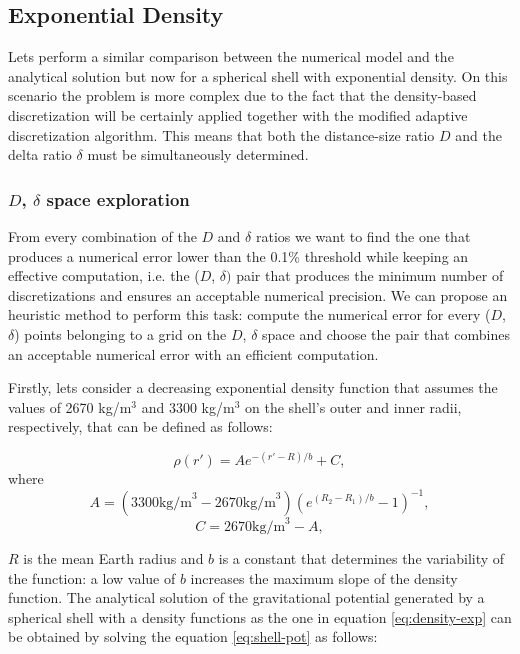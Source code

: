 \documentclass[extra]{gji}
\begin{document}
\subsection{Exponential Density}

Lets perform a similar comparison between the numerical model and
the analytical solution but now for a spherical shell with exponential
density.
On this scenario the problem is more complex due to the fact that the
density-based discretization will be certainly applied together with
the modified adaptive discretization algorithm.
This means that both the distance-size ratio $D$ and the delta ratio
$\delta$ must be simultaneously determined.

\subsubsection{$D$, $\delta$ space exploration}

From every combination of the $D$ and $\delta$ ratios we want to find
the one that produces a numerical error lower than the 0.1\% threshold
while keeping an effective computation, i.e. the ($D$, $\delta)$ pair
that produces the minimum number of discretizations and ensures an
acceptable numerical precision.
We can propose an heuristic method to perform this task: compute the
numerical error for every ($D$, $\delta$) points belonging to a grid on
the $D$, $\delta$ space and choose the pair that combines an
acceptable numerical error with an efficient computation.

Firstly, lets consider a decreasing exponential density function that
assumes the values of 2670 kg/m$^3$ and 3300 kg/m$^3$ on the shell's
outer and inner radii, respectively, that can be defined as follows:

\begin{equation}
    \rho(r') = A e^{-(r' - R)/b} + C,
\label{eq:density-exp}
\end{equation}
\noindent where
\begin{equation}
    A =
    (3300 \text{kg/m}^3 - 2670 \text{kg/m}^3)
    \left( e^{( R_2 - R_1 )/b} - 1 \right)^{-1},
\end{equation}
\begin{equation}
    C =
    2670 \text{kg/m}^3 - A,
\end{equation}

\noindent $R$ is the mean Earth radius and $b$ is a constant
that determines the variability of the function: a low value of $b$
increases the maximum slope of the density function.
The analytical solution of the gravitational potential generated by a
spherical shell with a density functions as the one in equation
\ref{eq:density-exp} can be obtained by solving the equation
\ref{eq:shell-pot} as follows:
\end{document}
